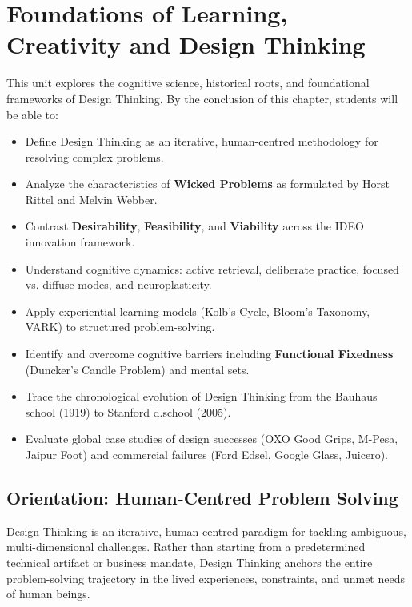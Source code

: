 \chapter{Foundations of Learning, Creativity and Design Thinking}
\label{chap:foundations_design_thinking}

\begin{tcolorbox}[enhanced, colback=boxnavybg, colframe=brandnavy, boxrule=1.2pt, arc=4pt, title={\Large\bfseries\sffamily Unit 1 Overview \& Learning Objectives}]
\sffamily\normalsize
This unit explores the cognitive science, historical roots, and foundational frameworks of Design Thinking. By the conclusion of this chapter, students will be able to:
\begin{itemize}[leftmargin=1.2em, itemsep=2pt, topsep=3pt]
    \item Define Design Thinking as an iterative, human-centred methodology for resolving complex problems.
    \item Analyze the characteristics of \textbf{Wicked Problems} as formulated by Horst Rittel and Melvin Webber.
    \item Contrast \textbf{Desirability}, \textbf{Feasibility}, and \textbf{Viability} across the IDEO innovation framework.
    \item Understand cognitive dynamics: active retrieval, deliberate practice, focused vs. diffuse modes, and neuroplasticity.
    \item Apply experiential learning models (Kolb's Cycle, Bloom's Taxonomy, VARK) to structured problem-solving.
    \item Identify and overcome cognitive barriers including \textbf{Functional Fixedness} (Duncker's Candle Problem) and mental sets.
    \item Trace the chronological evolution of Design Thinking from the Bauhaus school (1919) to Stanford d.school (2005).
    \item Evaluate global case studies of design successes (OXO Good Grips, M-Pesa, Jaipur Foot) and commercial failures (Ford Edsel, Google Glass, Juicero).
\end{itemize}
\end{tcolorbox}

\section{Orientation: Human-Centred Problem Solving}

Design Thinking is an iterative, human-centred paradigm for tackling ambiguous, multi-dimensional challenges. Rather than starting from a predetermined technical artifact or business mandate, Design Thinking anchors the entire problem-solving trajectory in the lived experiences, constraints, and unmet needs of human beings.

